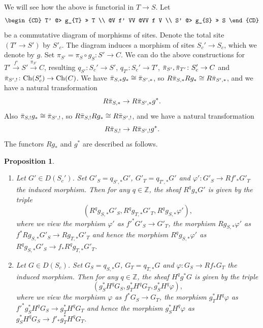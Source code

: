 \documentclass{amsart}
\newtheorem{Prop}[Thm]{Proposition}
\theoremstyle{remark}
\numberwithin{equation}{subsection}
\newcommand{\compose}{\mathbin{\circ}}
\newcommand{\Z}{\mathbb{Z}}
\newcommand{\Ch}{\mathrm{Ch}}
\begin{document}
We will see how the above is functorial in $T \to S$.
Let
	\[
		\begin{CD}
				T'
			@> g_{T} >>
				T
			\\ @V f' VV @VV f V \\
				S'
			@> g_{S} >>
				S
		\end{CD}
	\]
be a commutative diagram of morphisms of sites.
Denote the total site $(T' \to S')$ by $S'_{c}$.
The diagram induces a morphism of sites $S_{c}' \to S_{c}$,
which we denote by $g$.
Set $\pi_{S'} = \pi_{S} \compose g_{S} \colon S' \to C$.
We can do the above constructions for
$T' \stackrel{f'}{\to} S' \stackrel{\pi_{S'}}{\to} C$,
resulting $q_{S'} \colon S_{c}' \to S'$, $q_{T'} \colon S_{c}' \to T'$,
$\Bar{\pi}_{S'}, \Bar{\pi}_{T'} \colon S_{c}' \to C$ and
$\Bar{\pi}_{S', !} \colon \Ch(S_{c}') \to \Ch(C)$.
We have $\Bar{\pi}_{S, \ast} g_{\ast} \cong \Bar{\pi}_{S', \ast}$,
so $R \Bar{\pi}_{S, \ast} R g_{\ast} \cong R \Bar{\pi}_{S', \ast}$,
and we have a natural transformation
	\begin{equation} \label{0467}
			R \Bar{\pi}_{S, \ast}
		\to
			R \Bar{\pi}_{S', \ast} g^{\ast}.
	\end{equation}
Also $\Bar{\pi}_{S, !} g_{\ast} \cong \Bar{\pi}_{S', !}$,
so $R \Bar{\pi}_{S, !} R g_{\ast} \cong R \Bar{\pi}_{S', !}$,
and we have a natural transformation
	\begin{equation} \label{0468}
			R \Bar{\pi}_{S, !}
		\to
			R \Bar{\pi}_{S', !} g^{\ast}.
	\end{equation}
The functors $R g_{\ast}$ and $g^{\ast}$ are described as follows.

\begin{Prop} \label{0345} \mbox{}
	\begin{enumerate}
		\item
			Let $G' \in D(S_{c}')$.
			Set $G'_{S} = q_{S', \ast} G'$, $G'_{T} = q_{T', \ast} G'$
			and $\varphi' \colon G'_{S} \to R f'_{\ast} G'_{T}$ the induced morphism.
			Then for any $q \in \Z$, the sheaf $R^{q} g_{\ast} G'$ is given by the triple
				\[
					(R^{q} g_{S, \ast} G'_{S},
					R^{q} g_{T, \ast} G'_{T},
					R^{q} g_{S, \ast} \varphi'),
				\]
			where we view the morphism $\varphi'$ as $f'^{\ast} G'_{S} \to G'_{T}$,
			the morphism $R g_{S, \ast} \varphi'$ as
			$f^{\ast} R g_{S, \ast} G'_{S} \to R g_{T, \ast} G'_{T}$
			and hence the morphism $R^{q} g_{S, \ast} \varphi'$ as
			$R^{q} g_{S, \ast} G'_{S} \to f_{\ast} R^{q} g_{T, \ast} G'_{T}$.
		\item
			Let $G \in D(S_{c})$.
			Set $G_{S} = q_{S, \ast} G$, $G_{T} = q_{T, \ast} G$
			and $\varphi \colon G_{S} \to R f_{\ast} G_{T}$ the induced morphism.
			Then for any $q \in \Z$, the sheaf $H^{q} g^{\ast} G$ is given by the triple
				\[
					(g_{S}^{\ast} H^{q} G_{S},
					g_{T}^{\ast} H^{q} G_{T},
					g_{S}^{\ast} H^{q} \varphi),
				\]
			where we view the morphism $\varphi$ as $f^{\ast} G_{S} \to G_{T}$,
			the morphism $g_{T}^{\ast} H^{q} \varphi$ as
			$f'^{\ast} g_{S}^{\ast} H^{q} G_{S} \to g_{T}^{\ast} H^{q} G_{T}$
			and hence the morphism $g_{S}^{\ast} H^{q} \varphi$ as
			$g_{S}^{\ast} H^{q} G_{S} \to f'_{\ast} g_{T}^{\ast} H^{q} G_{T}$.
	\end{enumerate}
\end{Prop}
\end{document}
